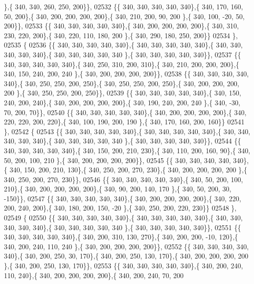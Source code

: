 \begin{DoxyCode}
      \},\{ 340, 340, 260, 250, 200\}\},
02532 \{\{ 340, 340, 340, 340, 340\},\{ 340, 170, 160,  50, 200\},\{ 340, 200, 200, 200, 200\},\{ 340, 210, 200,  90, 200
      \},\{ 340, 100, -20,  50, 200\}\},
02533 \{\{ 340, 340, 340, 340, 340\},\{ 340, 200, 200, 200, 200\},\{ 340, 310, 230, 220, 200\},\{ 340, 220, 110, 180, 200
      \},\{ 340, 290, 180, 250, 200\}\}
02534 \},
02535 \{
02536 \{\{ 340, 340, 340, 340, 340\},\{ 340, 340, 340, 340, 340\},\{ 340, 340, 340, 340, 340\},\{ 340, 340, 340, 340, 340
      \},\{ 340, 340, 340, 340, 340\}\},
02537 \{\{ 340, 340, 340, 340, 340\},\{ 340, 250, 310, 200, 310\},\{ 340, 210, 200, 200, 200\},\{ 340, 150, 240, 200, 240
      \},\{ 340, 200, 200, 200, 200\}\},
02538 \{\{ 340, 340, 340, 340, 340\},\{ 340, 250, 250, 200, 250\},\{ 340, 250, 250, 200, 250\},\{ 340, 200, 200, 200, 200
      \},\{ 340, 250, 250, 200, 250\}\},
02539 \{\{ 340, 340, 340, 340, 340\},\{ 340, 150, 240, 200, 240\},\{ 340, 200, 200, 200, 200\},\{ 340, 190, 240, 200, 240
      \},\{ 340, -30,  70, 200,  70\}\},
02540 \{\{ 340, 340, 340, 340, 340\},\{ 340, 200, 200, 200, 200\},\{ 340, 220, 220, 200, 220\},\{ 340, 100, 190, 200, 190
      \},\{ 340, 170, 160, 200, 160\}\}
02541 \},
02542 \{
02543 \{\{ 340, 340, 340, 340, 340\},\{ 340, 340, 340, 340, 340\},\{ 340, 340, 340, 340, 340\},\{ 340, 340, 340, 340, 340
      \},\{ 340, 340, 340, 340, 340\}\},
02544 \{\{ 340, 340, 340, 340, 340\},\{ 340, 150, 200, 210, 230\},\{ 340, 110, 200, 160,  90\},\{ 340,  50, 200, 100, 210
      \},\{ 340, 200, 200, 200, 200\}\},
02545 \{\{ 340, 340, 340, 340, 340\},\{ 340, 150, 200, 210, 130\},\{ 340, 250, 200, 270, 230\},\{ 340, 200, 200, 200, 200
      \},\{ 340, 250, 200, 270, 230\}\},
02546 \{\{ 340, 340, 340, 340, 340\},\{ 340,  50, 200, 100, 210\},\{ 340, 200, 200, 200, 200\},\{ 340,  90, 200, 140, 170
      \},\{ 340,  50, 200,  30, -150\}\},
02547 \{\{ 340, 340, 340, 340, 340\},\{ 340, 200, 200, 200, 200\},\{ 340, 220, 200, 240, 200\},\{ 340, 180, 200, 150, -20
      \},\{ 340, 250, 200, 220, 230\}\}
02548 \},
02549 \{
02550 \{\{ 340, 340, 340, 340, 340\},\{ 340, 340, 340, 340, 340\},\{ 340, 340, 340, 340, 340\},\{ 340, 340, 340, 340, 340
      \},\{ 340, 340, 340, 340, 340\}\},
02551 \{\{ 340, 340, 340, 340, 340\},\{ 340, 200, 310, 130, 270\},\{ 340, 200, 200, -10, 120\},\{ 340, 200, 240, 110, 240
      \},\{ 340, 200, 200, 200, 200\}\},
02552 \{\{ 340, 340, 340, 340, 340\},\{ 340, 200, 250,  30, 170\},\{ 340, 200, 250, 130, 170\},\{ 340, 200, 200, 200, 200
      \},\{ 340, 200, 250, 130, 170\}\},
02553 \{\{ 340, 340, 340, 340, 340\},\{ 340, 200, 240, 110, 240\},\{ 340, 200, 200, 200, 200\},\{ 340, 200, 240,  70, 200

\end{DoxyCode}
